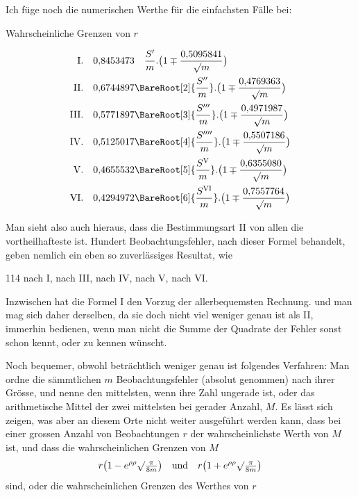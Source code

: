 Ich füge noch die numerischen Werthe für die einfachsten Fälle bei:
\begin{center}Wahrscheinliche Grenzen von \(r\)\end{center}
\[
\begin{array}{r@{\quad}l}
\mathrm{I}.&0{,}8453473\quad\dfrac{S'}m.\bigl(1\mp\dfrac{0{,}5095841}{\surd m}\bigr)\\[10pt]
\mathrm{II}.&0{,}6744897\BareRoot[2]{\dfrac{S''}m}.\bigl(1\mp\dfrac{0{,}4769363}{\surd m}\bigr)\\[10pt]
\mathrm{III}.&0{,}5771897\BareRoot[3]{\dfrac{S'''}m}.\bigl(1\mp\dfrac{0{,}4971987}{\surd m}\bigr)\\[10pt]
\mathrm{IV}.&0{,}5125017\BareRoot[4]{\dfrac{S''''}m}.\bigl(1\mp\dfrac{0{,}5507186}{\surd m}\bigr)\\[10pt]
\mathrm{V}.&0{,}4655532\BareRoot[5]{\dfrac{S^{\mathrm V}}m}.\bigl(1\mp\dfrac{0{,}6355080}{\surd m}\bigr)\\[10pt]
\mathrm{VI}.&0{,}4294972\BareRoot[6]{\dfrac{S^{\mathrm{VI}}}m}.\bigl(1\mp\dfrac{0{,}7557764}{\surd m}\bigr)
\end{array}
\]

Man sieht also auch hieraus, dass die Bestimmungsart II von allen die vortheilhafteste ist. Hundert Beobachtungsfehler, nach dieser Formel behandelt, geben nemlich ein eben so zuverlässiges Resultat, wie
\begin{center}
114 nach I, nach III, nach IV, nach V, nach VI.
\end{center}

Inzwischen hat die Formel I den Vorzug der allerbequemsten Rechnung. und man mag sich daher derselben, da sie doch nicht viel weniger genau ist als II, immerhin bedienen, wenn man nicht die Summe der Quadrate der Fehler sonst schon kennt, oder zu kennen wünscht.

Noch bequemer, obwohl beträchtlich weniger genau ist folgendes Verfahren: Man ordne die sämmtlichen \(m\) Beobachtungsfehler (absolut genommen) nach ihrer Grösse, und nenne den mittelsten, wenn ihre Zahl ungerade ist, oder das arithmetische Mittel der zwei mittelsten bei gerader Anzahl, \(M\). Es lässt sich zeigen, was aber an diesem Orte nicht weiter ausgeführt werden kann, dass bei einer grossen Anzahl von Beobachtungen \(r\) der wahrscheinlichste Werth von \(M\) ist, und dass die wahrscheinlichen Grenzen von \(M\)
\[
r\bigl(1-e^{\rho\rho}\surd\tfrac\pi{8m}\bigr)\quad\text{und}\quad r\bigl(1+e^{\rho\rho}\surd\tfrac\pi{8m}\bigr)
\]
sind, oder die wahrscheinlichen Grenzen des Werthes von \(r\)
